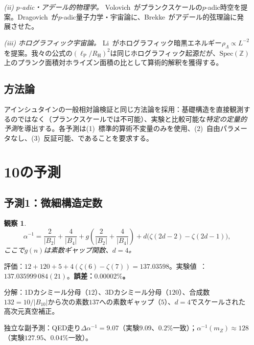 \documentclass[11pt,a4paper]{article}
\newtheorem{observation}[theorem]{観察}
\newcommand{\Spec}{\mathrm{Spec}}
\newcommand{\lP}{\ell_{\mathrm{P}}}
\newcommand{\RH}{R_{\mathrm{H}}}
\begin{document}
\textit{(ii) $p$-adic・アデール的物理学。} Volovich~\cite{Volovich1987}がプランクスケールの$p$-adic時空を提案。Dragovich~\cite{Dragovich2009}が$p$-adic量子力学・宇宙論に、Brekke~\cite{Brekke1993}がアデール的弦理論に発展させた。

\textit{(iii) ホログラフィック宇宙論。} Li~\cite{Li2004}がホログラフィック暗黒エネルギー$\rho_\Lambda \propto L^{-2}$を提案。我々の公式の$(\lP/\RH)^2$は同じホログラフィック起源だが、$\Spec(\mathbb{Z})$上のプランク面積対ホライズン面積の比として算術的解釈を獲得する。

\subsection{方法論}

アインシュタインの一般相対論検証と同じ方法論を採用：基礎構造を直接観測するのではなく（プランクスケールでは不可能）、実験と比較可能な\emph{特定の定量的予測}を導出する。各予測は(1)~標準的算術不変量のみを使用、(2)~自由パラメータなし、(3)~反証可能、であることを要求する。

\section{10の予測}

\subsection{予測1：微細構造定数}

\begin{observation}
\begin{equation}
  \alpha^{-1} = \frac{2}{|B_2|} + \frac{4}{|B_4|} + g\!\left(\frac{2}{|B_2|} + \frac{4}{|B_4|}\right) + d\bigl(\zeta(2d{-}2) - \zeta(2d{-}1)\bigr),
  \label{eq:alpha}
\end{equation}
ここで$g(n)$は素数ギャップ関数、$d = 4$。
\end{observation}

評価：$12 + 120 + 5 + 4(\zeta(6) - \zeta(7)) = 137.03598$。実験値~\cite{Mohr2016}：$137.035999\,084(21)$。\textbf{誤差：$0.00002\%$。}

分解：1Dカシミール分母（$12$）、3Dカシミール分母（$120$）、合成数$132 = 10/|B_{10}|$から次の素数$137$への素数ギャップ（$5$）、$d=4$でスケールされた高次元真空補正。

独立な副予測：QED走り$\Delta\alpha^{-1} = 9.07$（実験$9.09$、$0.2\%$一致）；$\alpha^{-1}(m_Z) \approx 128$（実験$127.95$、$0.04\%$一致）。
\end{document}
